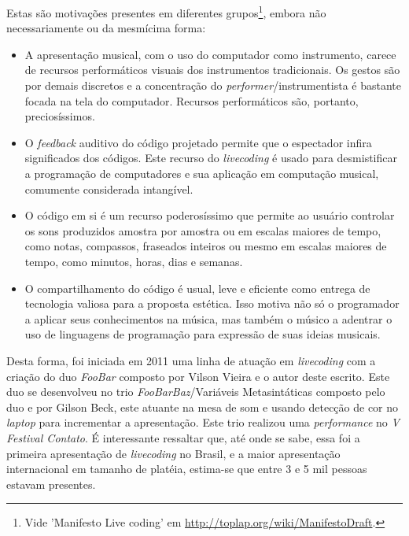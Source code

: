 Estas são motivações presentes em diferentes
grupos\footnote{Vide 'Manifesto Live coding' em
  \url{http://toplap.org/wiki/ManifestoDraft}.}, embora não
necessariamente ou da mesmícima forma:

\begin{itemize}
    \item A apresentação musical, com o uso do computador como instrumento,
    carece de recursos
      performáticos visuais dos instrumentos tradicionais.
       Os gestos são por demais discretos e a
      concentração do \emph{performer}/instrumentista é bastante focada na tela do
      computador. Recursos performáticos são, portanto, preciosíssimos.
    \item O \emph{feedback} auditivo do código projetado permite que o
      espectador infira significados dos códigos. 
      Este recurso do \emph{livecoding} é usado para
      desmistificar a programação de computadores e sua aplicação em
      computação musical, comumente considerada
      intangível.
    \item O código em si é um recurso poderosíssimo que permite ao
      usuário controlar os sons produzidos amostra por amostra ou em
      escalas maiores de tempo, como notas, compassos, fraseados inteiros ou
      mesmo em escalas maiores de tempo, como minutos, horas, dias e
      semanas.
    \item O compartilhamento do código é usual, leve e eficiente como
      entrega de tecnologia valiosa para a
      proposta estética. Isso motiva não só o programador a aplicar
      seus conhecimentos na música, mas também o músico a adentrar o
      uso de linguagens de programação para expressão de suas ideias
      musicais.
\end{itemize}

Desta forma, foi iniciada em 2011 uma linha de atuação em \emph{livecoding} com
a criação do duo \emph{FooBar} composto por Vilson Vieira e o autor
deste escrito. Este duo se desenvolveu no
trio \emph{FooBarBaz}/Variáveis Metasintáticas composto
pelo duo e por Gilson Beck, este atuante na mesa de som e usando detecção de cor no \emph{laptop}
para incrementar a apresentação. Este trio
realizou uma \emph{performance} no \emph{V Festival Contato}.
 É interessante ressaltar que, até onde se sabe,
essa foi a primeira apresentação de \emph{livecoding} no Brasil, e a maior
apresentação internacional em tamanho de platéia, estima-se que entre 3 e 5 mil
pessoas estavam presentes.

